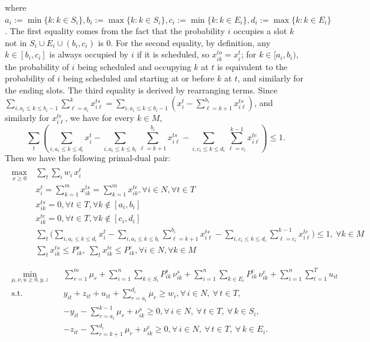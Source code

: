 \documentclass{article}
\begin{document}
where $a_i:=\min\{k:k\in S_i\},b_i:=\max\{k:k\in S_i\},c_i:=\min\{k:k\in E_i\},d_i:=\max\{k:k\in E_i\}$.
The first equality comes from the fact that the probability $i$ occupies a slot $k$ not in $S_i\cup E_i\cup (b_i,c_i)$ is $0$.
For the second equality, by definition, any $k\in [b_i,c_i]$ is always occupied by $i$ if it is scheduled, so $x_{ik}^{to}=x_{i}^t$; for $k\in[a_i,b_i)$, the probability of $i$ being scheduled and occupying $k$ at $t$ is equivalent to the probability of $i$ being scheduled and starting at or before $k$ at $t$, and similarly for the ending slots.
The third equality is derived by rearranging terms.
Since $\sum_{i,a_i\leq k\leq b_i-1}\sum_{\ell = a_i}^{k}x_{i\ell}^{ts} = \sum_{i,a_i\leq k\leq b_i-1}(x_i^t-\sum_{\ell = k+1}^{b_i}x_{i\ell}^{ts})$, and similarly for $x_{i\ell}^{te}$, we have for every $k\in M$,
\begin{equation}
    \label{eq:2}
    \sum_{t}\left(\sum_{i, a_i\leq k\leq d_i} x_i^t-\sum_{i,a_i\leq k\leq b_i}\sum_{\ell = k+1}^{b_i}x_{i\ell}^{ts}-\sum_{i,c_i\leq k\leq d_i}\sum_{\ell =c_i}^{k-1}x_{i\ell}^{te}\right)\leq 1.
\end{equation}
Then we have the following primal-dual pair:
    \begin{align*}
    \label{DLP-P}
    \tag{DLP-P}
    \begin{split}
            \max_{x\geq 0}~&\sum_{t}\sum_i w_i\, x_{i}^{t}\\
    &x_i^t =\sum_{k=1}^{m}x_{ik}^{ts}=\sum_{k=1}^{m}x_{ik}^{te}, \forall i\in N,\forall t\in T\\
    &x_{ik}^{ts}=0,\forall t\in T,\forall k\notin [a_i,b_i]\\
    &x_{ik}^{te}=0,\forall t\in T,\forall k\notin [c_i,d_i]\\
& \sum_{t}\biggl(\sum_{i, a_i\leq k\leq d_i} x_i^t 
  - \sum_{i,a_i\leq k\leq b_i}\sum_{\ell = k+1}^{b_i}x_{i\ell}^{ts} - \sum_{i,c_i\leq k\leq d_i}\sum_{\ell =c_i}^{k-1}x_{i\ell}^{te}\biggr) \leq 1,
  ~\forall k\in M \\
    &\sum_{t}x_{ik}^{ts}\leq P_{ik}^{s},~\sum_{t}x_{ik}^{te}\leq P_{ik}^{e},\forall i\in N,\forall k\in M\\
    \end{split}
\end{align*}
\begin{align*}
\label{DLP-D}
    \tag{DLP-D}
\begin{split}
\min_{\mu,\nu,u\geq 0,y,z}\quad 
& \sum_{r=1}^{m} \mu_r
  + \sum_{i=1}^{n}\sum_{k\in S_i} P^s_{ik}\,\nu^s_{ik}
  + \sum_{i=1}^{n}\sum_{k\in E_i} P^e_{ik}\,\nu^e_{ik}
  + \sum_{i=1}^{n}\sum_{t=1}^{T} u_{it}\\
\text{s.t.}\quad 
& y_{it} + z_{it} + u_{it} + \sum_{r=a_i}^{d_i} \mu_r \geq w_i,
\forall\, i\in N,\ \forall\, t\in T, \\
& -y_{it} -\sum_{r=a_i}^{k-1} \mu_r+\nu^s_{ik}\geq0,\forall\, i\in N,\ \forall\, t\in T,\ \forall\, k\in S_i, \\
& -z_{it}-\sum_{r=k+1}^{d_i} \mu_r+\nu^e_{ik}\geq 0,\forall\, i\in N,\ \forall\, t\in T,\ \forall\, k\in E_i.
\end{split}
\end{align*}
\end{document}

